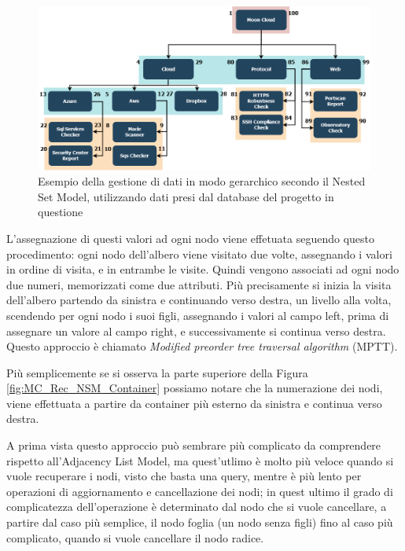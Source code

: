 \begin{figure}[ht!]
	\includegraphics[scale=0.40]{images/MC_Rec_NSM_Tree.png}
	\caption{Esempio della gestione di dati in modo gerarchico secondo il Nested Set Model, utilizzando dati presi dal database del 
	progetto in questione}
	\label{fig:MC_Rec_NSM_Tree}
\end{figure}

L'assegnazione di questi valori ad ogni nodo viene effetuata seguendo questo procedimento: ogni nodo dell'albero viene visitato due volte, 
assegnando i valori in ordine di visita, e in entrambe le visite. Quindi vengono associati ad ogni nodo due numeri, memorizzati come 
due attributi. 
Più precisamente si inizia la visita dell'albero partendo da sinistra e continuando verso destra, un livello alla volta, scendendo per ogni
nodo i suoi figli, assegnando i valori al campo left, prima di assegnare un valore al campo right, e successivamente si continua verso 
destra. Questo approccio è chiamato \textit{Modified preorder tree traversal algorithm} (MPTT).

Più semplicemente se si osserva la parte superiore della Figura \ref{fig:MC_Rec_NSM_Container} possiamo notare che la numerazione dei nodi, viene
effettuata a partire da container più esterno da sinistra e continua verso destra.

A prima vista questo approccio può sembrare più complicato da comprendere rispetto all'Adjacency List Model, ma quest'utlimo è
molto più veloce quando si vuole recuperare i nodi, visto che basta una query, mentre è più lento per operazioni di aggiornamento e 
cancellazione dei nodi; in quest ultimo il grado di complicatezza dell'operazione è determinato dal nodo che si vuole cancellare, a 
partire dal caso più semplice, il nodo foglia (un nodo senza figli) fino al caso più complicato, quando si vuole cancellare il nodo 
radice.

\newpage

